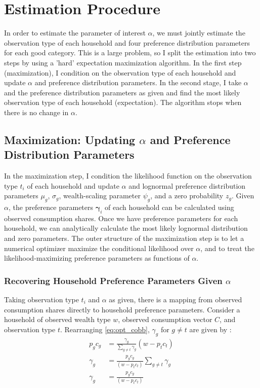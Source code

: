 \section{Estimation Procedure} 

In order to estimate the parameter of interest $\alpha$, we must jointly estimate the observation type of each household and four preference distribution parameters for each good category.  This is a large problem, so I split the estimation into two steps by using a 'hard' expectation maximization algorithm.  In the first step (maximization), I condition on the observation type of each household and update $\alpha$ and preference distribution parameters.  In the second stage, I take $\alpha$ and the preference distribution parameters as given and find the most likely observation type of each household (expectation).  The algorithm stops when there is no change in $\alpha$.

\subsection{Maximization: Updating $\alpha$ and Preference Distribution Parameters} 

In the maximization step, I condition the likelihood function on the observation type $t_i$ of each household and update $\alpha$ and lognormal preference distribution parameters $\mu_g$, $\sigma_g$, wealth-scaling parameter $\psi_g$, and a zero probability $z_g$.  Given $\alpha$, the preference parameters $\boldsymbol{\gamma}_i$ of each household can be calculated using observed consumption shares.  Once we have preference parameters for each household, we can analytically calculate the most likely lognormal distribution and zero parameters.  The outer structure of the maximization step is to let a numerical optimizer maximize the conditional likelihood over $\alpha$, and to treat the likelihood-maximizing preference parameters as functions of $\alpha$.

\subsubsection{Recovering Household Preference Parameters Given $\alpha$}
\label{sec:upd_prefs}

Taking observation type $t_i$ and $\alpha$ as given, there is a mapping from observed consumption shares directly to household preference parameters.  Consider a household of observed wealth type $w$, observed consumption vector $C$, and observation type $t$.  Rearranging \eqref{eq:opt_cobb}, $\gamma_g$ for $g\neq t$ are given by :
\begin{align}
	\label{eq:sgd}
	p_gc_g &= \frac{\gamma_g}{\sum_{g\neq t}\gamma_g}  \left(w-  p_t c_t\right)\\
	\label{eq:sgdsol}
	\gamma_g &= \frac{p_g c_g}{\left(w- p_t c_t\right)} \sum_{g\neq t}\gamma_g\\
	\label{eq:gamsol}
	\gamma_g &= \frac{p_g c_g}{\left(w- p_t c_t\right)} 
\end{align}

